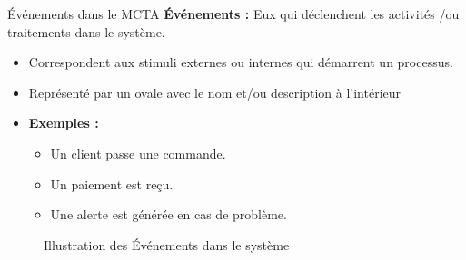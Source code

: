 \documentclass{beamer}
\begin{document}
\begin{frame}{Événements dans le MCTA}
    \textbf{Événements :} Eux qui déclenchent les activités /ou traitements dans le système.
    \begin{itemize}
        \item Correspondent aux stimuli externes ou internes qui démarrent un processus.
        \item Représenté par un ovale avec le nom et/ou description à l'intérieur 
        \item \textbf{Exemples :}
        \begin{itemize}
            \item Un client passe une commande.
            \item Un paiement est reçu.
            \item Une alerte est générée en cas de problème.
        \end{itemize}
    \end{itemize}
    \vspace{1em}
    \label{fig4}
    \begin{figure}
        \centering
        \caption{Illustration des Événements dans le système}
    \end{figure}
\end{frame}
\end{document}
